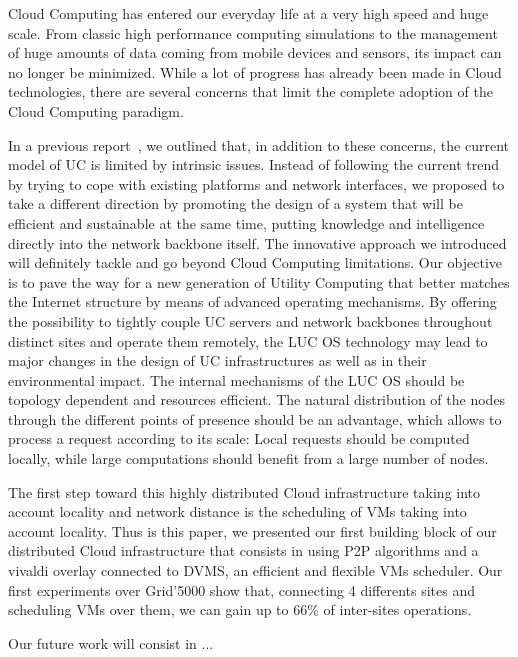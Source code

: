 
Cloud Computing has entered our everyday life at a very high speed and huge scale. From classic high performance computing simulations to the management of huge amounts of data coming from mobile devices and sensors, its impact can no longer be minimized. While a lot of progress has already been made in Cloud technologies, there are several concerns that limit the complete adoption of the Cloud Computing paradigm.

In a previous report~\cite{lebre:hal-00854204}, we outlined that, in addition to these concerns, the current model of UC is limited by intrinsic issues. Instead of following the current trend by trying to cope with existing platforms and network interfaces, we proposed to take a different direction by promoting the design of a system that will be efficient and sustainable at the same time, putting knowledge and intelligence directly into the network backbone itself. The innovative approach we introduced will definitely tackle and go beyond Cloud Computing limitations. Our objective is to pave the way for a new generation of Utility Computing that better matches the Internet structure by means of advanced operating mechanisms. By offering the possibility to tightly couple UC servers and network backbones throughout distinct sites and operate them remotely, the LUC OS technology may lead to major changes in the design of UC infrastructures as well as in their environmental impact. The internal mechanisms of the LUC OS should be topology dependent and resources efficient. The natural distribution of the nodes through the different points of presence should be an advantage, which allows to process a request according to its scale: Local requests should be computed locally, while large computations should benefit from a large number of nodes.

The first step toward this highly distributed Cloud infrastructure taking into account locality and network distance is the scheduling of VMs taking into account locality. Thus is this paper, we presented our first building block of our distributed Cloud infrastructure that consists in using P2P algorithms and a vivaldi overlay connected to DVMS, an efficient and flexible VMs scheduler. Our first experiments over Grid'5000 show that, connecting 4 differents sites and scheduling VMs over them, we can gain up to 66\% of inter-sites operations. 

Our future work will consist in ... 
